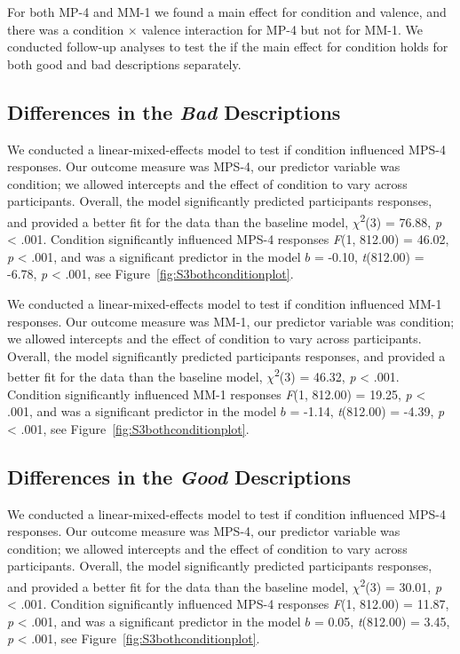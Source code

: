 \documentclass[
  man,floatsintext]{apa7}
\begin{document}
For both MP-4 and MM-1 we found a main effect for condition and valence, and there was a condition \(\times\) valence interaction for MP-4 but not for MM-1. We conducted follow-up analyses to test the if the main effect for condition holds for both good and bad descriptions separately.

\subsection{\texorpdfstring{Differences in the \emph{Bad} Descriptions}{Differences in the Bad Descriptions}}\label{differences-in-the-bad-descriptions}

We conducted a linear-mixed-effects model to test if condition influenced MPS-4 responses. Our outcome measure was MPS-4, our predictor variable was condition; we allowed intercepts and the effect of condition to vary across participants. Overall, the model significantly predicted participants responses, and provided a better fit for the data than the baseline model, \(\chi\)\textsuperscript{2}(3) = 76.88, \emph{p} \textless{} .001. Condition significantly influenced MPS-4 responses \emph{F}(1, 812.00) = 46.02, \emph{p} \textless{} .001, and was a significant predictor in the model \(b\) = -0.10, \emph{t}(812.00) = -6.78, \emph{p} \textless{} .001, see Figure~\ref{fig:S3bothconditionplot}.

We conducted a linear-mixed-effects model to test if condition influenced MM-1 responses. Our outcome measure was MM-1, our predictor variable was condition; we allowed intercepts and the effect of condition to vary across participants. Overall, the model significantly predicted participants responses, and provided a better fit for the data than the baseline model, \(\chi\)\textsuperscript{2}(3) = 46.32, \emph{p} \textless{} .001. Condition significantly influenced MM-1 responses \emph{F}(1, 812.00) = 19.25, \emph{p} \textless{} .001, and was a significant predictor in the model \(b\) = -1.14, \emph{t}(812.00) = -4.39, \emph{p} \textless{} .001, see Figure~\ref{fig:S3bothconditionplot}.

\subsection{\texorpdfstring{Differences in the \emph{Good} Descriptions}{Differences in the Good Descriptions}}\label{differences-in-the-good-descriptions}

We conducted a linear-mixed-effects model to test if condition influenced MPS-4 responses. Our outcome measure was MPS-4, our predictor variable was condition; we allowed intercepts and the effect of condition to vary across participants. Overall, the model significantly predicted participants responses, and provided a better fit for the data than the baseline model, \(\chi\)\textsuperscript{2}(3) = 30.01, \emph{p} \textless{} .001. Condition significantly influenced MPS-4 responses \emph{F}(1, 812.00) = 11.87, \emph{p} \textless{} .001, and was a significant predictor in the model \(b\) = 0.05, \emph{t}(812.00) = 3.45, \emph{p} \textless{} .001, see Figure~\ref{fig:S3bothconditionplot}.
\end{document}
